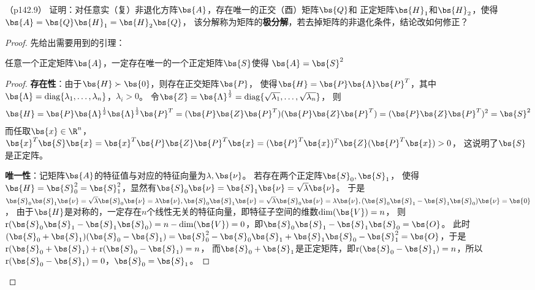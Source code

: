 \documentclass[12pt, a4paper, oneside, UTF8]{ctexbook}
\begin{document}
\begin{question}（p142.9）
    证明：对任意实（复）非退化方阵$\bs{A}$，存在唯一的正交（酉）矩阵$\bs{Q}$和
    正定矩阵$\bs{H}_1$和$\bs{H}_2$，使得$\bs{A}=\bs{Q}\bs{H}_1=\bs{H}_2\bs{Q}$，
    该分解称为矩阵的\textbf{极分解}，若去掉矩阵的非退化条件，结论改如何修正？
\end{question}


\begin{proof}
    先给出需要用到的引理：
    \begin{lemma} \label{正定引理}
        任意一个正定矩阵$\bs{A}$，一定存在唯一的一个正定矩阵$\bs{S}$使得
        $\bs{A}=\bs{S}^2$
    \end{lemma}
    \begin{proof}
        \textbf{存在性}：由于$\bs{H} \succ \bs{0}$，则存在正交矩阵$\bs{P}$，
        使得$\bs{H}=\bs{P}\bs{\Lambda}\bs{P}^T$，其中$\bs{\Lambda}
        =\mathrm{diag}\{\lambda_1,\ldots,\lambda_n\}$，$\lambda_i > 0$。
        令$\bs{Z}=\bs{\Lambda}^{\frac{1}{2}}=\mathrm{diag}\{\sqrt{\lambda_1},\ldots,\sqrt{\lambda_n}\}$，
        则
        \begin{align*}
            \bs{H}=\bs{P}\bs{\Lambda}^{\frac{1}{2}}\bs{\Lambda}^{\frac{1}{2}}\bs{P}^T=(\bs{P}\bs{Z}\bs{P}^T)(\bs{P}\bs{Z}\bs{P}^T)
            =(\bs{P}\bs{Z}\bs{P}^T)^2=\bs{S}^2
        \end{align*}
        而任取$\bs{x}\in \R^n$，$\bs{x}^T\bs{S}\bs{x}=
        \bs{x}^T\bs{P}\bs{Z}\bs{P}^T\bs{x}=
        (\bs{P}^T\bs{x})^T\bs{Z}(\bs{P}^T\bs{x}) >0$，
        这说明了$\bs{S}$是正定阵。

        \textbf{唯一性}：记矩阵$\bs{A}$的特征值与对应的特征向量为$\lambda,\bs{\nu}$。
        若存在两个正定阵$\bs{S}_0,\bs{S}_1$，
        使得$\bs{H}=\bs{S}_0^2=\bs{S}_1^2$，显然有$\bs{S}_0\bs{\nu}=\bs{S}_1\bs{\nu}=\sqrt{\lambda}\bs{\nu}$。
        于是$\bs{S}_0\bs{S}_1\bs{\nu}=\sqrt{\lambda}\bs{S}_0\bs{\nu}=\lambda \bs{\nu},
        \bs{S}_0\bs{S}_1\bs{\nu}=\sqrt{\lambda}\bs{S}_0\bs{\nu}=\lambda \bs{\nu},
        (\bs{S}_0\bs{S}_1-\bs{S}_1\bs{S}_0)\bs{\nu}=\bs{0}$，
        由于$\bs{H}$是对称的，一定存在$n$个线性无关的特征向量，即特征子空间的维数$\mathrm{dim}(\bs{V})=n$，
        则$\mathrm{r}(\bs{S}_0\bs{S}_1-\bs{S}_1\bs{S}_0)=n-\mathrm{dim}(\bs{V})=0$，即$\bs{S}_0\bs{S}_1-\bs{S}_1\bs{S}_0=\bs{O}$。
        此时$(\bs{S}_0+\bs{S}_1)(\bs{S}_0-\bs{S}_1)=\bs{S}_0^2-\bs{S}_0\bs{S}_1+\bs{S}_1\bs{S}_0-\bs{S}_1^2=\bs{O}$，于是$\mathrm{r}(\bs{S}_0+\bs{S}_1)+\mathrm{r}(\bs{S}_0-\bs{S}_1)=n$，
        而$\bs{S}_0+\bs{S}_1$是正定矩阵，即$\mathrm{r}(\bs{S}_0-\bs{S}_1)=n$，所以$\mathrm{r}(\bs{S}_0-\bs{S}_1)=0$，$\bs{S}_0=\bs{S}_1$。
    

\end{proof}
\end{proof}
\end{document}
